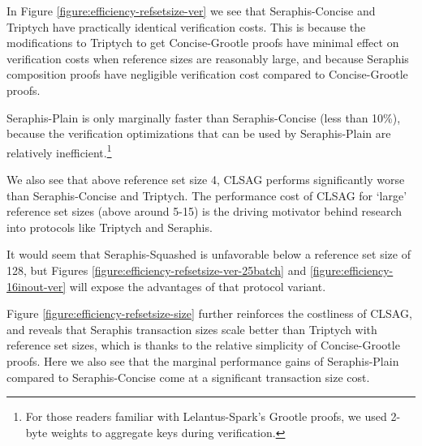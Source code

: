In Figure \ref{figure:efficiency-refsetsize-ver} we see that Seraphis-Concise and Triptych have practically identical verification costs. This is because the modifications to Triptych to get Concise-Grootle proofs have minimal effect on verification costs when reference sizes are reasonably large, and because Seraphis composition proofs have negligible verification cost compared to Concise-Grootle proofs.

Seraphis-Plain is only marginally faster than Seraphis-Concise (less than 10\%), because the verification optimizations that can be used by Seraphis-Plain are relatively inefficient.\footnote{For those readers familiar with Lelantus-Spark's Grootle proofs, we used 2-byte weights to aggregate keys during verification.}

We also see that above reference set size 4, CLSAG performs significantly worse than Seraphis-Concise and Triptych. The performance cost of CLSAG for `large' reference set sizes (above around 5-15) is the driving motivator behind research into protocols like Triptych and Seraphis.

It would seem that Seraphis-Squashed is unfavorable below a reference set size of 128, but Figures \ref{figure:efficiency-refsetsize-ver-25batch} and \ref{figure:efficiency-16inout-ver} will expose the advantages of that protocol variant.

Figure \ref{figure:efficiency-refsetsize-size} further reinforces the costliness of CLSAG, and reveals that Seraphis transaction sizes scale better than Triptych with reference set sizes, which is thanks to the relative simplicity of Concise-Grootle proofs. Here we also see that the marginal performance gains of Seraphis-Plain compared to Seraphis-Concise come at a significant transaction size cost.

